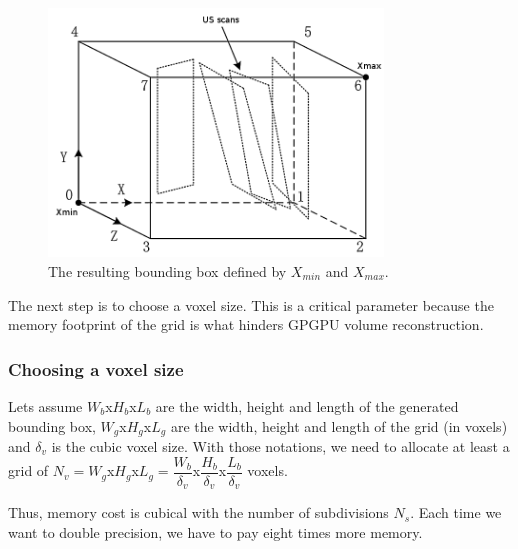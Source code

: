 \documentclass[12pt,journal,compsoc]{IEEEtran}
\begin{document}
\begin{figure}[h!]
\centering
\includegraphics[width=3.5in]{bounding_box}
\caption{The resulting bounding box defined by $X_{min}$ and $X_{max}$.}
\label{fig_2}
\end{figure}

The next step is to choose a voxel size. This is a critical parameter because the memory footprint of the grid is what hinders GPGPU volume reconstruction. 

\subsubsection{Choosing a voxel size}

Lets assume $W_b$x$H_b$x$L_b$ are the width, height and length of the generated bounding box, $W_g$x$H_g$x$L_g$ are the width, height and length of the grid (in voxels) and $\delta_v$ is the cubic voxel size. With those notations, we need to allocate at least a grid of $N_v = W_g$x$H_g$x$L_g =  \dfrac{W_b}{\delta_v}$x$\dfrac{H_b}{\delta_v}$x$\dfrac{L_b}{\delta_v}$ voxels. \par

\vspace{0.2cm}
Thus, memory cost is cubical with the number of subdivisions $N_s$. Each time we want to double precision, we have to pay eight times more memory.
\end{document}
